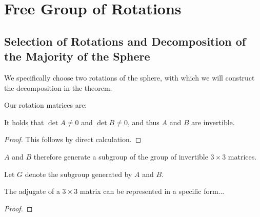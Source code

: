 %

\chapter{Free Group of Rotations}

\section{Selection of Rotations and Decomposition of the Majority of the Sphere}

We specifically choose two rotations of the sphere, with which we will construct the decomposition in the theorem.

\begin{definition}\label{def:spec_rot}
Our rotation matrices are:
\end{definition}

\begin{lemma} \label{lemma:a_b_invertible}
It holds that $\det A \neq 0$ and $\det B \neq 0$, and thus $A$ and $B$ are invertible.
\end{lemma}
\begin{proof} 
This follows by direct calculation.
\end{proof}

$A$ and $B$ therefore generate a subgroup of the group of invertible $3 \times 3$ matrices.

\begin{definition}\label{def:spec_rot_generated} 
Let $G$ denote the subgroup generated by $A$ and $B$.
\end{definition}

\begin{lemma}\label{lem:adjugate_fin_three}
The adjugate of a $3 \times 3$ matrix can be represented in a specific form...
\end{lemma}
\begin{proof}
\end{proof}

